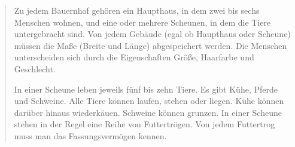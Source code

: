 \begin{quotation}
\noindent
Zu jedem Bauernhof gehören ein Haupthaus, in dem zwei bis sechs Menschen wohnen,
und eine oder mehrere Scheunen, in dem die Tiere untergebracht sind. Von jedem
Gebäude (egal ob Haupthaus oder Scheune) müssen die Maße (Breite und Länge)
abgespeichert werden. Die Menschen unterscheiden sich durch die Eigenschaften
Größe, Haarfarbe und Geschlecht.

\noindent
In einer Scheune leben jeweils fünf bis zehn Tiere. Es gibt Kühe, Pferde und
Schweine. Alle Tiere können laufen, stehen oder liegen. Kühe können darüber
hinaus wiederkäuen. Schweine können grunzen. In einer Scheune stehen in der
Regel eine Reihe von Futtertrögen. Von jedem Futtertrog muss man das
Fassungsvermögen kennen.
\end{quotation}
